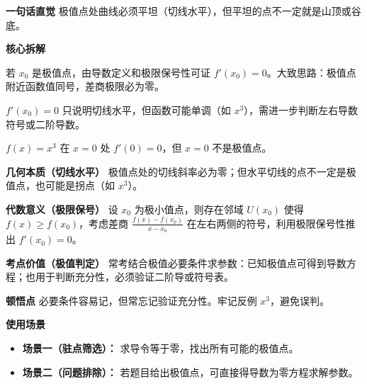 \begin{explanationbox}
	\textbf{\textcolor{CExplanation}{一句话直觉}}
	极值点处曲线必须平坦（切线水平），但平坦的点不一定就是山顶或谷底。

	\medskip
	\textbf{\textcolor{CExplanation}{核心拆解}}
	\begin{description}[style=nextline, leftmargin=2.8em, labelsep=0.5em, itemsep=0.45em]
		\item[\textbf{要点一（必要条件）：}]
			若 $x_0$ 是极值点，由导数定义和极限保号性可证 $f'(x_0)=0$。大致思路：极值点附近函数值同号，差商极限必为零。
		\item[\textbf{要点二（不充分性）：}]
			$f'(x_0)=0$ 只说明切线水平，但函数可能单调（如 $x^3$），需进一步判断左右导数符号或二阶导数。
		\item[\textbf{要点三（反例构造）：}]
			$f(x)=x^3$ 在 $x=0$ 处 $f'(0)=0$，但 $x=0$ 不是极值点。
	\end{description}

	\medskip
	\textbf{\textcolor{CExplanation}{几何本质（切线水平）}}
	极值点处的切线斜率必为零；但水平切线的点不一定是极值点，也可能是拐点（如 $x^3$）。

	\medskip
	\textbf{\textcolor{CExplanation}{代数意义（极限保号）}}
	设 $x_0$ 为极小值点，则存在邻域 $U(x_0)$ 使得 $f(x)\ge f(x_0)$，考虑差商 $\frac{f(x)-f(x_0)}{x-x_0}$ 在左右两侧的符号，利用极限保号性推出 $f'(x_0)=0$。

	\medskip
	\textbf{\textcolor{CExplanation}{考点价值（极值判定）}}
	常考结合极值必要条件求参数：已知极值点可得到导数方程；也用于判断充分性，必须验证二阶导或符号表。

	\medskip
	\textbf{\textcolor{CExplanation}{顿悟点}}
	必要条件容易记，但常忘记验证充分性。牢记反例 $x^3$，避免误判。

	\medskip
	\textbf{\textcolor{CExplanation}{使用场景}}
	\begin{itemize}[leftmargin=*, itemsep=0.5em, topsep=0.4em]
		\item \textbf{场景一（驻点筛选）：} 求导令等于零，找出所有可能的极值点。
		\item \textbf{场景二（问题排除）：} 若题目给出极值点，可直接得导数为零方程求解参数。
	\end{itemize}

\end{explanationbox}
